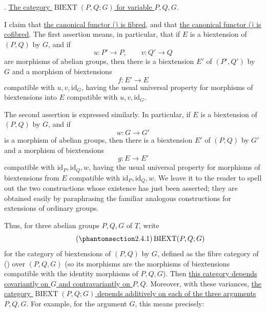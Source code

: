 
. \underline{The category $\operatorname{BIEXT}(P,Q;G)$ for
variable $P,Q,G$}.

I claim that \underline{the canonical functor () is fibred}, and
that \underline{the canonical functor () is cofibred}. The first
assertion means, in particular, that if $E$ is a biextension of
$(P,Q)$ by $G$, and if
\[
 u:P'\longrightarrow P,\qquad v:Q'\longrightarrow Q
\]
are morphisms of abelian groups, then there is a biextension $E'$ of
$(P',Q')$ by $G$ and a morphism of biextensions
\[
 f:E'\longrightarrow E
\]
compatible with $u,v,\mathrm{id}_G$, having the usual universal
property for morphisms of biextensions into $E$ compatible with
$u,v,\mathrm{id}_G$.

The second assertion is expressed similarly. In particular, if $E$ is
a biextension of $(P,Q)$ by $G$, and if
\[
 w:G\longrightarrow G'
\]
is a morphism of abelian groups, then there is a biextension $E'$ of
$(P,Q)$ by $G'$ and a morphism of biextensions
\[
 g:E\longrightarrow E'
\]
compatible with $\mathrm{id}_P,\mathrm{id}_Q,w$, having the usual
universal property for morphisms of biextensions from $E$ compatible
with $\mathrm{id}_P,\mathrm{id}_Q,w$. We leave it to the reader to
spell out the two constructions whose existence has just been
asserted; they are obtained easily by paraphrasing the familiar
analogous constructions for extensions of ordinary groups.

Thus, for three abelian groups $P,Q,G$ of $\underline T$, write
\begin{equation}\tag{\SGARefTarget{sga7.sga7i.evii.n2-4-1}{2.4.1}}
 \operatorname{BIEXT}(P,Q;G)
\end{equation}
for the category of biextensions of $(P,Q)$ by $G$, defined as the
fibre category of () over $(P,Q,G)$ (so its morphisms are the
morphisms of biextensions compatible with the identity morphisms of
$P,Q,G$). Then \underline{this category depends covariantly on $G$ and
contravariantly on $P,Q$}. Moreover, with these variances,
\underline{the category $\operatorname{BIEXT}(P,Q;G)$ depends
additively on each of the three arguments $P,Q,G$}. For example, for
the argument $G$, this means precisely:

